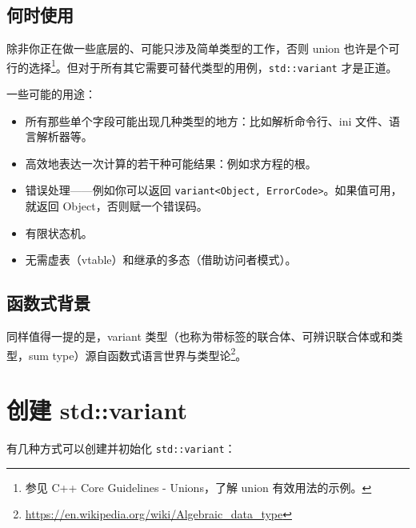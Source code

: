 \subsection{何时使用}

除非你正在做一些底层的、可能只涉及简单类型的工作，否则 union 也许是个可行的选择\footnote{参见 C++ Core Guidelines - Unions，了解 union 有效用法的示例。}。但对于所有其它需要可替代类型的用例，\texttt{std::variant} 才是正道。

一些可能的用途：

\begin{itemize}
\item 所有那些单个字段可能出现几种类型的地方：比如解析命令行、ini 文件、语言解析器等。
\item 高效地表达一次计算的若干种可能结果：例如求方程的根。
\item 错误处理——例如你可以返回 \texttt{variant<Object, ErrorCode>}。如果值可用，就返回 Object，否则赋一个错误码。
\item 有限状态机。
\item 无需虚表（vtable）和继承的多态（借助访问者模式）。
\end{itemize}

\subsection{函数式背景}

同样值得一提的是，variant 类型（也称为带标签的联合体、可辨识联合体或和类型，sum type）源自函数式语言世界与类型论\footnote{\url{https://en.wikipedia.org/wiki/Algebraic_data_type}}。

\section{创建 std::variant}

有几种方式可以创建并初始化 \texttt{std::variant}：

